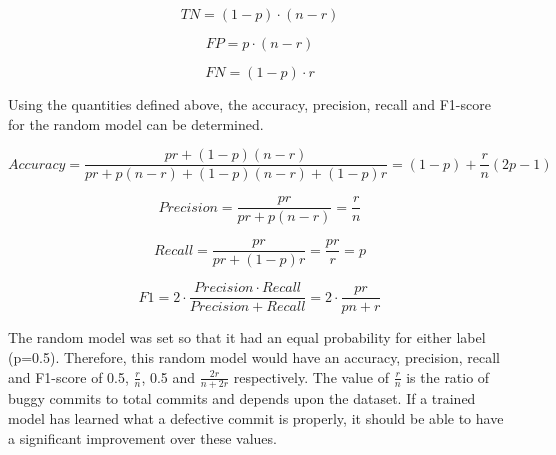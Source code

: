 \documentclass[../main.tex]{subfiles}
\begin{document}
\begin{equation}
     TN = (1-p) \cdot (n-r)
\end{equation}

\begin{equation}
     FP = p \cdot (n-r)
\end{equation}

\begin{equation}
     FN = (1-p) \cdot r
\end{equation}

\vspace{10pt}

Using the quantities defined above, the accuracy, precision, recall and F1-score for the random model can be determined.
   
\begin{equation}\label{eqn:randAccuracy}
     Accuracy = \frac{pr+(1-p)(n-r)}{pr+p(n-r)+(1-p)(n-r)+(1-p)r} = (1-p) + \frac{r}{n}(2p-1)
\end{equation}

\begin{equation}\label{eqn:randPrecision}
    Precision = \frac{pr}{pr+p(n-r)} = \frac{r}{n}
\end{equation}

\begin{equation}\label{eqn:randRecall}
    Recall = \frac{pr}{pr+(1-p)r}=\frac{pr}{r} = p
\end{equation}


\begin{equation}\label{eqn:randF1}
    F1 = 2 \cdot \frac{Precision \cdot Recall}{Precision + Recall} = 2 \cdot \frac{pr}{pn+r} 
\end{equation}

\vspace{20pt}

The random model was set so that it had an equal probability for either label (p=0.5). Therefore, this random model would have an accuracy, precision, recall and F1-score of 0.5, $\frac{r}{n}$, 0.5 and $\frac{2r}{n+2r}$ respectively. The value of $\frac{r}{n}$ is the ratio of buggy commits to total commits and depends upon the dataset. If a trained model has learned what a defective commit is properly, it should be able to have a significant improvement over these values. 
\end{document}
